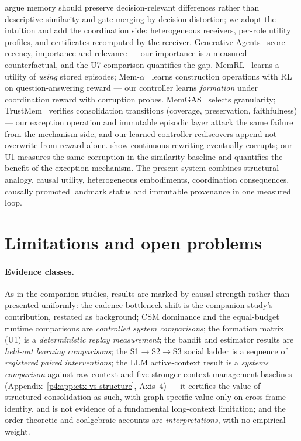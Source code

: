 \documentclass{article}
\begin{document}
\citet{rdd2026} argue memory should preserve decision-relevant
differences rather than descriptive similarity and gate merging by
decision distortion; we adopt the intuition and add the coordination
side: heterogeneous receivers, per-role utility profiles, and
certificates recomputed by the receiver. Generative
Agents~\citep{genagents2023} score recency, importance and relevance
--- our importance is a measured counterfactual, and the U7
comparison quantifies the gap. MemRL~\citep{memrl2026} learns a
utility of \emph{using} stored episodes; Mem-$\alpha$~\citep{memalpha2025}
learns construction operations with RL on question-answering reward
--- our controller learns \emph{formation} under coordination reward
with corruption probes. MemGAS~\citep{memgas2025} selects granularity;
TrustMem~\citep{trustmem2026} verifies consolidation transitions
(coverage, preservation, faithfulness) --- our exception operation
and immutable episodic layer attack the same failure from the
mechanism side, and our learned controller rediscovers
append-not-overwrite from reward alone. \citet{faulty2026} show
continuous rewriting eventually corrupts; our U1 measures the same
corruption in the similarity baseline and quantifies the benefit of the exception mechanism. The
present system combines structural analogy, causal
utility, heterogeneous embodiments, coordination consequences,
causally promoted landmark status and immutable provenance in one measured
loop.


\section{Limitations and open problems}
\label{p5:sec:limits}

\paragraph{Evidence classes.} As in the companion studies, results
are marked by causal strength rather than presented uniformly: the
cadence bottleneck shift is the companion study's contribution,
restated as background; CSM dominance and the equal-budget runtime
comparisons are \emph{controlled system comparisons}; the formation
matrix (U1) is a \emph{deterministic replay measurement}; the bandit
and estimator results are \emph{held-out learning comparisons}; the
S1$\to$S2$\to$S3 social ladder is a sequence of \emph{registered
paired interventions}; the LLM active-context result is a
\emph{systems comparison} against raw context and five stronger
context-management baselines (Appendix~\ref{p4:app:ctx-vs-structure},
Axis~4) --- it certifies the value of structured consolidation as
such, with graph-specific value only on cross-frame identity, and is
not evidence of a fundamental long-context limitation; and
the order-theoretic and coalgebraic accounts are \emph{interpretations},
with no empirical weight.
\end{document}
